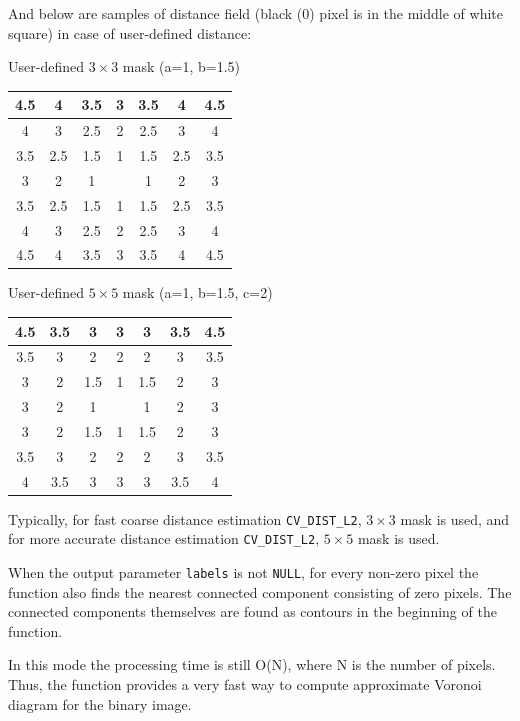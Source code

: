 And below are samples of distance field (black (0) pixel is in the middle of white square) in case of user-defined distance:

User-defined $3 \times 3$ mask (a=1, b=1.5)

\begin{tabular}{| c | c | c | c | c | c | c |}
\hline
4.5 & 4 & 3.5 & 3 & 3.5 & 4 & 4.5\\ \hline
4 & 3 & 2.5 & 2 & 2.5 & 3 & 4\\ \hline
3.5 & 2.5 & 1.5 & 1 & 1.5 & 2.5 & 3.5\\ \hline
3 & 2 & 1 &     & 1 & 2 & 3\\ \hline
3.5 & 2.5 & 1.5 & 1 & 1.5 & 2.5 & 3.5\\ \hline
4 & 3 & 2.5 & 2 & 2.5 & 3 & 4\\ \hline
4.5 & 4 & 3.5 & 3 & 3.5 & 4 & 4.5\\ \hline
\end{tabular}

User-defined $5 \times 5$ mask (a=1, b=1.5, c=2)

\begin{tabular}{| c | c | c | c | c | c | c |}
\hline
4.5 & 3.5 & 3 & 3 & 3 & 3.5 & 4.5\\ \hline
3.5 & 3 & 2 & 2 & 2 & 3 & 3.5\\ \hline
3 & 2 & 1.5 & 1 & 1.5 & 2 & 3\\ \hline
3 & 2 & 1 & & 1 & 2 & 3\\ \hline
3 & 2 & 1.5 & 1 & 1.5 & 2 & 3\\ \hline
3.5 & 3 & 2 & 2 & 2 & 3 & 3.5\\ \hline
4 & 3.5 & 3 & 3 & 3 & 3.5 & 4\\ \hline
\end{tabular}


Typically, for fast coarse distance estimation \texttt{CV\_DIST\_L2},
$3\times 3$ mask is used, and for more accurate distance estimation
\texttt{CV\_DIST\_L2}, $5\times 5$ mask is used.

When the output parameter \texttt{labels} is not \texttt{NULL}, for
every non-zero pixel the function also finds the nearest connected
component consisting of zero pixels. The connected components
themselves are found as contours in the beginning of the function.

In this mode the processing time is still O(N), where N is the number of
pixels. Thus, the function provides a very fast way to compute approximate
Voronoi diagram for the binary image.

